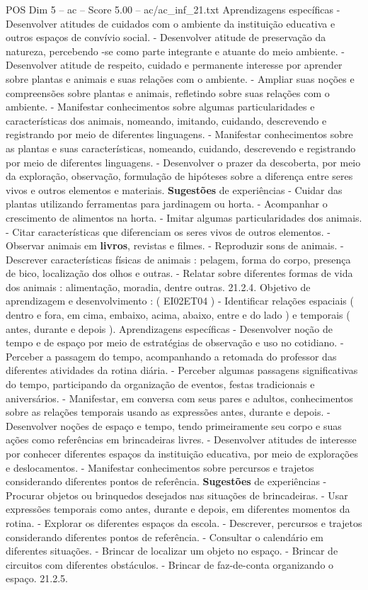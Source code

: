 \begin{textsample}{POS Dim 5 – ac – Score 5.00 – ac/ac\_inf\_21.txt}
Aprendizagens específicas - Desenvolver atitudes de cuidados com o ambiente da instituição educativa e outros espaços de convívio social. - Desenvolver atitude de preservação da natureza, percebendo -se como parte integrante e atuante do meio ambiente. - Desenvolver atitude de respeito, cuidado e permanente interesse por aprender sobre plantas e animais e suas relações com o ambiente. - Ampliar suas noções e compreensões sobre plantas e animais, refletindo sobre suas relações com o ambiente. - Manifestar conhecimentos sobre algumas particularidades e características dos animais, nomeando, imitando, cuidando, descrevendo e registrando por meio de diferentes linguagens. - Manifestar conhecimentos sobre as plantas e suas características, nomeando, cuidando, descrevendo e registrando por meio de diferentes linguagens. - Desenvolver o prazer da descoberta, por meio da exploração, observação, formulação de hipóteses sobre a diferença entre seres vivos e outros elementos e materiais. \textbf{Sugestões} de experiências - Cuidar das plantas utilizando ferramentas para jardinagem ou horta. - Acompanhar o crescimento de alimentos na horta. - Imitar algumas particularidades dos animais. - Citar características que diferenciam os seres vivos de outros elementos. - Observar animais em \textbf{livros}, revistas e filmes. - Reproduzir sons de animais. - Descrever características físicas de animais : pelagem, forma do corpo, presença de bico, localização dos olhos e outras. - Relatar sobre diferentes formas de vida dos animais : alimentação, moradia, dentre outras. 21.2.4.
Objetivo de aprendizagem e desenvolvimento : ( EI02ET04 ) - Identificar relações espaciais ( dentro e fora, em cima, embaixo, acima, abaixo, entre e do lado ) e temporais ( antes, durante e depois ).
Aprendizagens específicas - Desenvolver noção de tempo e de espaço por meio de estratégias de observação e uso no cotidiano. - Perceber a passagem do tempo, acompanhando a retomada do professor das diferentes atividades da rotina diária. - Perceber algumas passagens significativas do tempo, participando da organização de eventos, festas tradicionais e aniversários. - Manifestar, em conversa com seus pares e adultos, conhecimentos sobre as relações temporais usando as expressões antes, durante e depois. - Desenvolver noções de espaço e tempo, tendo primeiramente seu corpo e suas ações como referências em brincadeiras livres. - Desenvolver atitudes de interesse por conhecer diferentes espaços da instituição educativa, por meio de explorações e deslocamentos. - Manifestar conhecimentos sobre percursos e trajetos considerando diferentes pontos de referência. \textbf{Sugestões} de experiências - Procurar objetos ou brinquedos desejados nas situações de brincadeiras. - Usar expressões temporais como antes, durante e depois, em diferentes momentos da rotina. - Explorar os diferentes espaços da escola. - Descrever, percursos e trajetos considerando diferentes pontos de referência. - Consultar o calendário em diferentes situações. - Brincar de localizar um objeto no espaço. - Brincar de circuitos com diferentes obstáculos. - Brincar de faz-de-conta organizando o espaço. 21.2.5.

\end{textsample}
